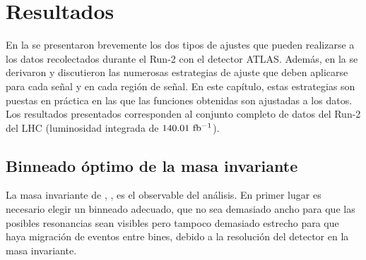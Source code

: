 \chapter{Resultados}
\label{ch:results}


En la \Ch{\ref{ch:strategy}} se presentaron brevemente los dos tipos de ajustes que pueden realizarse a los datos recolectados durante el Run-2 con el detector \ac{ATLAS}. Además, en la \Sect{\ref{sec:bkg:modeling}} se derivaron y discutieron las numerosas estrategias de ajuste que deben aplicarse para cada señal y en cada región de señal. En este capítulo, estas estrategias son puestas en práctica en las que las funciones obtenidas son ajustadas a los datos. Los resultados presentados corresponden al conjunto completo de datos del Run-2 del \ac{LHC} (luminosidad integrada de \(140.01~\ifb\)).














\section{Binneado óptimo de la masa invariante}
\label{sec:results:obs}


La masa invariante de \gammajet, \myj, es el observable del análisis. En primer lugar es necesario elegir un binneado adecuado, que no sea demasiado ancho para que las posibles resonancias sean visibles pero tampoco demasiado estrecho para que haya migración de eventos entre bines, debido a la resolución del detector en la masa invariante.

